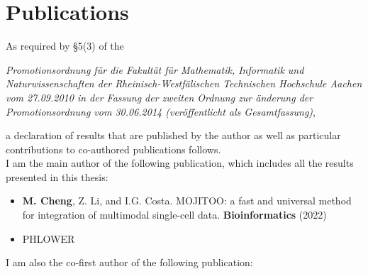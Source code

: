 \chapter*{Publications}
As required by \S 5(3) of the \\

\begin{addmargin}{0.05\textwidth}
\textit{Promotionsordnung f\"ur die Fakult\"at f\"ur Mathematik, Informatik und Naturwissenschaften der Rheinisch-Westf\"alischen Technischen Hochschule Aachen vom 27.09.2010 in der \linebreak Fassung der zweiten Ordnung zur \"anderung der Promotionsordnung vom 30.06.2014 \linebreak (ver\"offentlicht als Gesamtfassung)},
\end{addmargin} 
\vspace{0.5cm}

\noindent
a declaration of results that are published by the author as well as particular contributions to co-authored publications follows. \\


I am the main author of the following publication, which includes all the results presented in this
thesis:

\begin{addmargin}{0.02\textwidth}
	\begin{itemize}
	\item \textbf{M. Cheng}, Z. Li, and I.G. Costa. MOJITOO: a fast and universal method for integration of multimodal single-cell data. \textbf{Bioinformatics} (2022) 
		  \\
	\end{itemize}
\end{addmargin}


\begin{addmargin}{0.02\textwidth}
	\begin{itemize}
	\item PHLOWER
		  \\
	\end{itemize}
\end{addmargin}


I am also the co-first author of the following publication:\\


